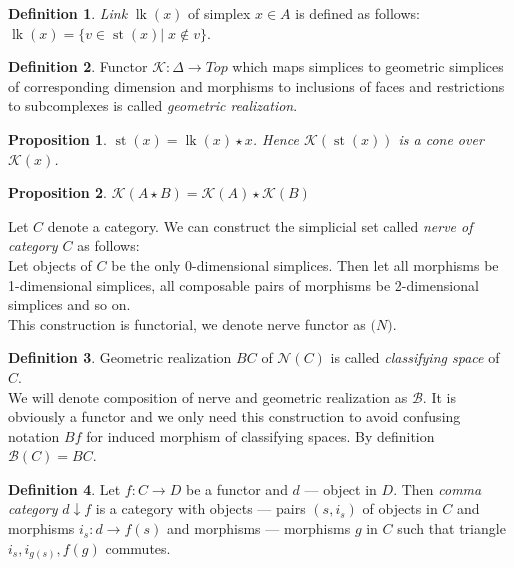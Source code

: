 \documentclass[a4paper, 12pt]{article}
\newtheorem{proposition}{Proposition}
\theoremstyle{definition}
\newtheorem{definition}{Definition}
\theoremstyle{remark}
\newcommand{\define}[1]{{\textit{#1}}}
\begin{document}
\begin{definition}
  \define{Link} $\operatorname{lk}(x)$ of simplex $x \in A$ is defined as follows: $\operatorname{lk}(x) = \{v \in \operatorname{st}(x)|\; x \not\in v\}$.
\end{definition}

\begin{definition}
  Functor $\mathcal{K} : \Delta \to Top$ which maps simplices to geometric simplices of corresponding dimension and morphisms to inclusions of faces and restrictions to subcomplexes is called \define{geometric realization}.
\end{definition}

\begin{proposition}
  $\operatorname{st}(x) = \operatorname{lk}(x) \star x$. Hence $\mathcal{K}(\operatorname{st}(x))$ is a cone over $\mathcal{K}(x)$.
\end{proposition}

\begin{proposition}
  $\mathcal{K}(A \star B) = \mathcal{K}(A) \star \mathcal{K}(B)$
\end{proposition}

Let $C$ denote a category. We can construct the simplicial set called \define{nerve of category $C$} as follows:\\
Let objects of $C$ be the only 0-dimensional simplices. Then let all morphisms be 1-dimensional simplices, all composable pairs of morphisms be 2-dimensional simplices and so on.\\
This construction is functorial, we denote nerve functor as $\mathcal(N)$.

\begin{definition}
  Geometric realization $BC$ of $\mathcal{N}(C)$ is called \define{classifying space} of $C$.\\

  We will denote composition of nerve and geometric realization as $\mathcal{B}$. It is obviously a functor and we only need this construction to avoid confusing notation $Bf$ for induced morphism of classifying spaces. By definition $\mathcal{B}(C) = BC$.
\end{definition}

\begin{definition}
  Let $f: C \to D$ be a functor and $d$ --- object in $D$. Then \define{comma category} $d \downarrow f$ is a category with objects --- pairs $(s,i_s)$ of objects in $C$ and morphisms $i_s : d \to f(s)$ and morphisms --- morphisms $g$ in $C$ such that triangle $i_s, i_{g(s)}, f(g)$ commutes.
\end{definition}
\end{document}
